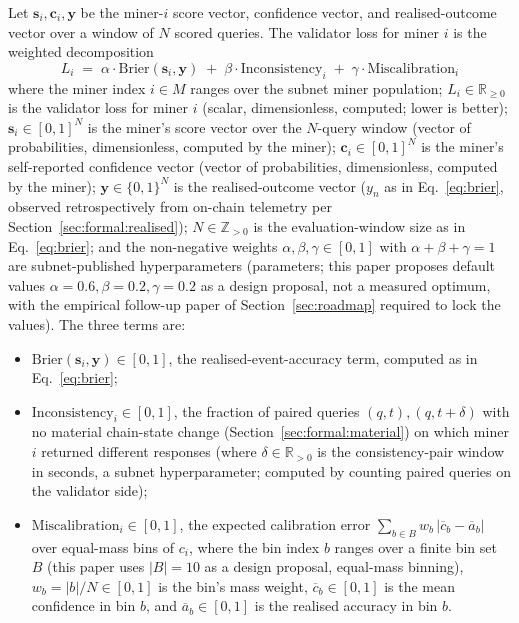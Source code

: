 \documentclass[11pt,a4paper]{article}
\begin{document}
Let $\mathbf{s}_i, \mathbf{c}_i, \mathbf{y}$ be the miner-$i$ score vector, confidence
vector, and realised-outcome vector over a window of $N$ scored queries. The validator
loss for miner $i$ is the weighted decomposition
\begin{equation}
  L_i \;=\; \alpha \cdot \text{Brier}(\mathbf{s}_i, \mathbf{y})
        \;+\; \beta \cdot \text{Inconsistency}_i
        \;+\; \gamma \cdot \text{Miscalibration}_i
  \label{eq:vloss}
\end{equation}
where the miner index $i \in M$ ranges over the subnet miner population;
$L_i \in \mathbb{R}_{\ge 0}$ is the validator loss for miner $i$ (scalar,
dimensionless, computed; lower is better); $\mathbf{s}_i \in [0, 1]^N$ is the
miner's score vector over the $N$-query window (vector of probabilities,
dimensionless, computed by the miner); $\mathbf{c}_i \in [0, 1]^N$ is the
miner's self-reported confidence vector (vector of probabilities, dimensionless,
computed by the miner); $\mathbf{y} \in \{0, 1\}^N$ is the realised-outcome
vector ($y_n$ as in Eq.~\eqref{eq:brier}, observed retrospectively from
on-chain telemetry per Section~\ref{sec:formal:realised}); $N \in \mathbb{Z}_{>0}$
is the evaluation-window size as in Eq.~\eqref{eq:brier}; and the non-negative
weights $\alpha, \beta, \gamma \in [0, 1]$ with $\alpha + \beta + \gamma = 1$
are subnet-published hyperparameters (parameters; this paper proposes
default values $\alpha = 0.6, \beta = 0.2, \gamma = 0.2$ as a design proposal,
not a measured optimum, with the empirical follow-up paper of
Section~\ref{sec:roadmap} required to lock the values). The three terms are:
\begin{itemize}
  \item $\text{Brier}(\mathbf{s}_i, \mathbf{y}) \in [0, 1]$, the
        realised-event-accuracy term, computed as in Eq.~\eqref{eq:brier};
  \item $\text{Inconsistency}_i \in [0, 1]$, the fraction of paired queries
        $(q, t), (q, t + \delta)$ with no material chain-state change
        (Section~\ref{sec:formal:material}) on which miner $i$ returned different
        responses (where $\delta \in \mathbb{R}_{>0}$ is the consistency-pair
        window in seconds, a subnet hyperparameter; computed by counting paired
        queries on the validator side);
  \item $\text{Miscalibration}_i \in [0, 1]$, the expected calibration error
        $\sum_{b \in B} w_b \,|\overline{c}_b - \overline{a}_b|$ over equal-mass
        bins of $c_i$, where the bin index $b$ ranges over a finite bin set $B$
        (this paper uses $|B| = 10$ as a design proposal, equal-mass binning),
        $w_b = |b| / N \in [0, 1]$ is the bin's mass weight, $\overline{c}_b
        \in [0, 1]$ is the mean confidence in bin $b$, and $\overline{a}_b
        \in [0, 1]$ is the realised accuracy in bin $b$.
\end{itemize}
\end{document}
